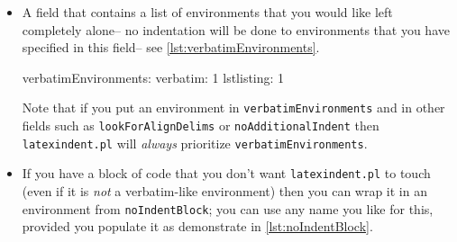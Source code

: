 \begin{itemize}
	\begin{minipage}{.5\textwidth}
		\begin{lstlisting}[caption={\lstinline!tabular! before},label={lst:tabularbefore}]
\begin{tabular}{cccc}
1&	2 &3       &4\\
5& &6       &\\
\end{tabular}
		\end{lstlisting}
	\end{minipage}
	\begin{minipage}{.5\textwidth}
		\begin{lstlisting}[caption={\lstinline!tabular! after},label={lst:tabularafter}]
\begin{tabular}{cccc}
 1 & 2 & 3 & 4 \\
 5 &   & 6 &   \\
\end{tabular}
		\end{lstlisting}
	\end{minipage}
												 		 		 		 		 					
	If you find that \lstinline!latexindent.pl! does not perform satisfactorily on such 
	environments then you can either remove them from \lstinline!lookForAlignDelims! altogether, or set the relevant key to \lstinline!0!, for example \lstinline!tabular: 0!, or if you just want to ignore \emph{specific} 
	instances of the environment, you could wrap them in something from \lstinline!noIndentBlock! (see \cref{lst:noIndentBlock}).
												 		 		 		 		 					
	\item[\verbitem{verbatimEnvironments}] A field that contains a list of environments
	that you would like left completely alone-- no indentation will be done
	to environments that you have specified in this field-- see \cref{lst:verbatimEnvironments}.
												 		 		 		 		 					
	\begin{yaml}[caption={\lstinline!verbatimEnvironments!},label={lst:verbatimEnvironments}]
verbatimEnvironments:
    verbatim: 1
    lstlisting: 1
	\end{yaml}
	Note that if  you put an environment in \lstinline!verbatimEnvironments! 
	and in other fields such as \lstinline!lookForAlignDelims! or \lstinline!noAdditionalIndent! 
	then \lstinline!latexindent.pl! will \emph{always} prioritize \lstinline!verbatimEnvironments!.
												 		 		 		 		 					
	\item[\verbitem{noIndentBlock}] If you have a block of code that you don't 
	want \lstinline!latexindent.pl! to touch (even if it is \emph{not} a verbatim-like
	environment) then you can wrap it in an environment from \lstinline!noIndentBlock!;
	you can use any name you like for this, provided you populate it as demonstrate in 
	\cref{lst:noIndentBlock}.
												 		 		 		 		 					

\end{itemize}
